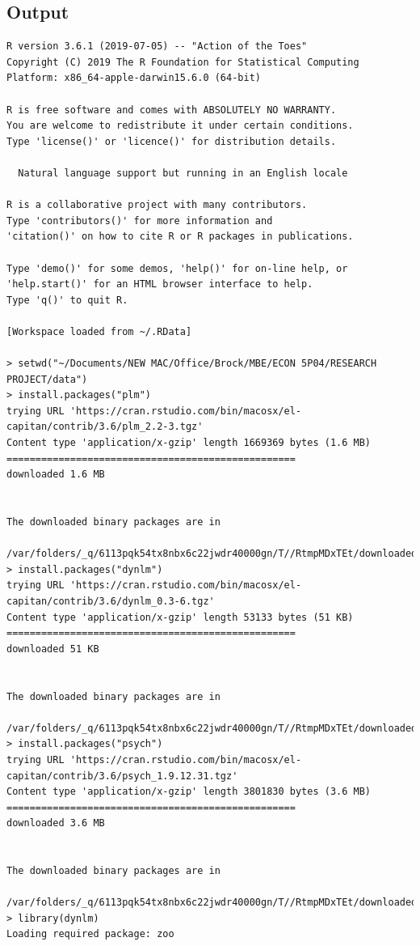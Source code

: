 \documentclass[12pt]{article}
\begin{document}
\subsection{Output}

\begin{verbatim}
R version 3.6.1 (2019-07-05) -- "Action of the Toes"
Copyright (C) 2019 The R Foundation for Statistical Computing
Platform: x86_64-apple-darwin15.6.0 (64-bit)

R is free software and comes with ABSOLUTELY NO WARRANTY.
You are welcome to redistribute it under certain conditions.
Type 'license()' or 'licence()' for distribution details.

  Natural language support but running in an English locale

R is a collaborative project with many contributors.
Type 'contributors()' for more information and
'citation()' on how to cite R or R packages in publications.

Type 'demo()' for some demos, 'help()' for on-line help, or
'help.start()' for an HTML browser interface to help.
Type 'q()' to quit R.

[Workspace loaded from ~/.RData]

> setwd("~/Documents/NEW MAC/Office/Brock/MBE/ECON 5P04/RESEARCH PROJECT/data")
> install.packages("plm")
trying URL 'https://cran.rstudio.com/bin/macosx/el-capitan/contrib/3.6/plm_2.2-3.tgz'
Content type 'application/x-gzip' length 1669369 bytes (1.6 MB)
==================================================
downloaded 1.6 MB


The downloaded binary packages are in
	/var/folders/_q/6113pqk54tx8nbx6c22jwdr40000gn/T//RtmpMDxTEt/downloaded_packages
> install.packages("dynlm")
trying URL 'https://cran.rstudio.com/bin/macosx/el-capitan/contrib/3.6/dynlm_0.3-6.tgz'
Content type 'application/x-gzip' length 53133 bytes (51 KB)
==================================================
downloaded 51 KB


The downloaded binary packages are in
	/var/folders/_q/6113pqk54tx8nbx6c22jwdr40000gn/T//RtmpMDxTEt/downloaded_packages
> install.packages("psych")
trying URL 'https://cran.rstudio.com/bin/macosx/el-capitan/contrib/3.6/psych_1.9.12.31.tgz'
Content type 'application/x-gzip' length 3801830 bytes (3.6 MB)
==================================================
downloaded 3.6 MB


The downloaded binary packages are in
	/var/folders/_q/6113pqk54tx8nbx6c22jwdr40000gn/T//RtmpMDxTEt/downloaded_packages
> library(dynlm)
Loading required package: zoo


\end{verbatim}
\end{document}

